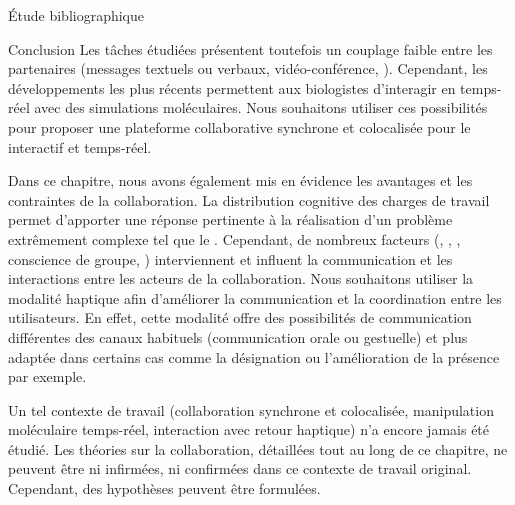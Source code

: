 \documentclass[myfrancais,ngerman,english,french]{mythesis}
\begin{document}
\begin{mychapter}{Étude bibliographique}
\begin{mysection}{Conclusion}
			Les tâches étudiées présentent toutefois un couplage faible entre les partenaires (messages textuels ou verbaux, vidéo-conférence, \myetc).
			Cependant, les développements les plus récents permettent aux biologistes d'interagir en temps-réel avec des simulations moléculaires.
			Nous souhaitons utiliser ces possibilités pour proposer une plateforme collaborative synchrone et colocalisée pour le  interactif et temps-réel.

			Dans ce chapitre, nous avons également mis en évidence les avantages et les contraintes de la collaboration.
			La distribution cognitive des charges de travail permet d'apporter une réponse pertinente à la réalisation d'un problème extrêmement complexe tel que le .
			Cependant, de nombreux facteurs (, , \mygrounding, conscience de groupe, \myetc) interviennent et influent la communication et les interactions entre les acteurs de la collaboration.
			Nous souhaitons utiliser la modalité haptique afin d'améliorer la communication et la coordination entre les utilisateurs.
			En effet, cette modalité offre des possibilités de communication différentes des canaux habituels (communication orale ou gestuelle) et plus adaptée dans certains cas comme la désignation ou l'amélioration de la présence par exemple.

			Un tel contexte de travail (collaboration synchrone et colocalisée, manipulation moléculaire temps-réel, interaction avec retour haptique) n'a encore jamais été étudié.
			Les théories sur la collaboration, détaillées tout au long de ce chapitre, ne peuvent être ni infirmées, ni confirmées dans ce contexte de travail original.
			Cependant, des hypothèses peuvent être formulées.


\end{mysection}
\end{mychapter}
\end{document}

